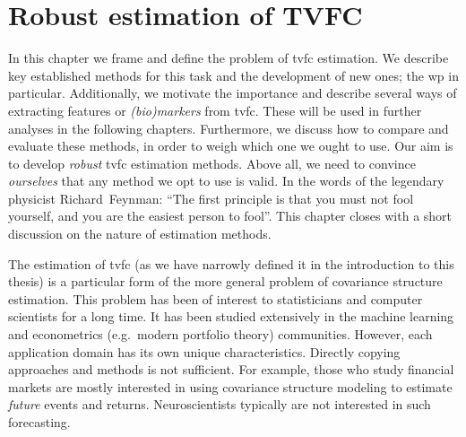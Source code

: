 \chapter{Robust estimation of TVFC}
\label{ch:methods}

In this chapter we frame and define the problem of \gls{tvfc} estimation.
We describe key established methods for this task and the development of new ones; the \gls{wp} in particular.
Additionally, we motivate the importance and describe several ways of extracting features or \emph{(bio)markers} from \gls{tvfc}.
These will be used in further analyses in the following chapters.
%
Furthermore, we discuss how to compare and evaluate these methods, in order to weigh which one we ought to use.
Our aim is to develop \emph{robust} \gls{tvfc} estimation methods.
Above all, we need to convince \emph{ourselves} that any method we opt to use is valid.
In the words of the legendary physicist Richard~Feynman: ``The first principle is that you must not fool yourself, and you are the easiest person to fool''.
%
This chapter closes with a short discussion on the nature of estimation methods.

The estimation of \gls{tvfc} (as we have narrowly defined it in the introduction to this thesis) is a particular form of the more general problem of covariance structure estimation.
This problem has been of interest to statisticians and computer scientists for a long time.
It has been studied extensively in the machine learning and econometrics (e.g.~modern portfolio theory) communities.
%
However, each application domain has its own unique characteristics.
Directly copying approaches and methods is not sufficient.
For example, those who study financial markets are mostly interested in using covariance structure modeling to estimate \emph{future} events and returns.
Neuroscientists typically are not interested in such forecasting.

